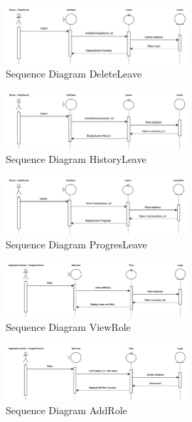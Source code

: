     \begin{figure}[h]
    \centering
    \includegraphics[width=0.6\textwidth]{Sequence 7.3.png}
    \caption{Sequence Diagram DeleteLeave}
    \end{figure}

    \begin{figure}[h]
    \centering
    \includegraphics[width=0.6\textwidth]{Sequence 7.4.png}
    \caption{Sequence Diagram HistoryLeave}
    \end{figure}


    \begin{figure}[h]
    \centering
    \includegraphics[width=0.6\textwidth]{Sequence 7.5.png}
    \caption{Sequence Diagram ProgresLeave}
    \end{figure}



\begin{figure}[h]
    \centering
    \includegraphics[width=0.6\textwidth]{Sequence 8.1.png}
    \caption{Sequence Diagram ViewRole}
    \end{figure}

    \begin{figure}[h]
    \centering
    \includegraphics[width=0.6\textwidth]{Sequence 8.2.png}
    \caption{Sequence Diagram AddRole}
    \end{figure}

